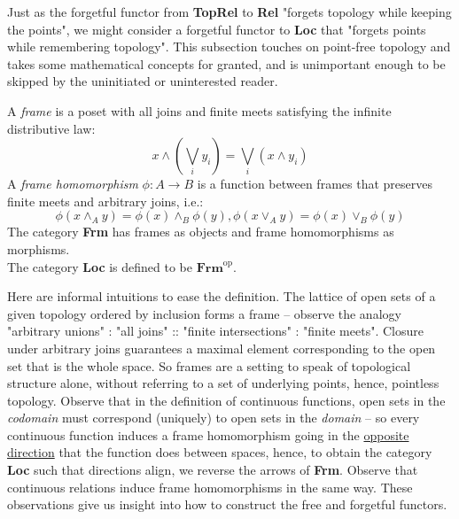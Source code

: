 
Just as the forgetful functor from \textbf{TopRel} to \textbf{Rel} "forgets topology while keeping the points", we might consider a forgetful functor to \textbf{Loc} that "forgets points while remembering topology". This subsection touches on point-free topology and takes some mathematical concepts for granted, and is unimportant enough to be skipped by the uninitiated or uninterested reader.

\begin{rem}
A \emph{frame} is a poset with all joins and finite meets satisfying the infinite distributive law:
\[x \wedge (\bigvee\limits_{i}y_i) = \bigvee\limits_{i}(x \wedge y_i)\]
A \emph{frame homomorphism} $\phi: A \rightarrow B$ is a function between frames that preserves finite meets and arbitrary joins, i.e.:
\[\phi(x \wedge_A y) = \phi(x) \wedge_B \phi(y), \phi(x \vee_A y) = \phi(x) \vee_B \phi(y)\]
The category \textbf{Frm} has frames as objects and frame homomorphisms as morphisms.\\
The category \textbf{Loc} is defined to be $\textbf{Frm}^\text{op}$.
\end{rem}

\begin{remark}
Here are informal intuitions to ease the definition. The lattice of open sets of a given topology ordered by inclusion forms a frame -- observe the analogy "arbitrary unions" : "all joins" :: "finite intersections" : "finite meets". Closure under arbitrary joins guarantees a maximal element corresponding to the open set that is the whole space. So frames are a setting to speak of topological structure alone, without referring to a set of underlying points, hence, pointless topology. Observe that in the definition of continuous functions, open sets in the \emph{codomain} must correspond (uniquely) to open sets in the \emph{domain} -- so every continuous function induces a frame homomorphism going in the \underline{opposite direction} that the function does between spaces, hence, to obtain the category \textbf{Loc} such that directions align, we reverse the arrows of \textbf{Frm}. Observe that continuous relations induce frame homomorphisms in the same way. These observations give us insight into how to construct the free and forgetful functors.
\end{remark}


